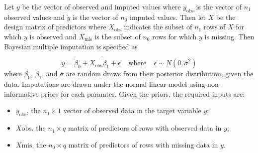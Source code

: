 \documentclass[12pt,]{article}
\providecommand{\tightlist}{%
  \setlength{\itemsep}{0pt}\setlength{\parskip}{0pt}}
\begin{document}
Let \(y\) be the vector of observed and imputed values where
\(y_{\text{obs}}\) is the vector of \(n_1\) observed values and
\(\dot{y}\) is the vector of \(n_0\) imputed values. Then let \(X\) be
the design matrix of predictors where \(X_{\text{obs}}\) indicates the
subset of \(n_1\) rows of \(X\) for which \(y\) is observed and
\(X_{\text{mis}}\) is the subset of \(n_0\) rows for which \(y\) is
missing. Then Bayesian multiple imputation is specified as

\[
\dot{y} = \dot{\beta}_0 + X_{\text{obs}}\dot{\beta}_1 + \dot{\epsilon} ~~~~~\text{where}~~~~~ \dot{\epsilon} \sim N(0, \dot{\sigma}^2)
\] where \(\dot{\beta}_0\), \(\dot{\beta}_1\), and \(\dot{\sigma}\) are
random draws from their posterior distribution, given the data.
Imputations are drawn under the normal linear model using
non-informative priors for each paramter. Given the priors, the required
inputs are:

\begin{itemize}
\tightlist
\item
  \(y_{\text{obs}}\), the \(n_1 \times 1\) vector of observed data in
  the target variable \(y\);
\item
  \(X{\text{obs}}\), the \(n_1 \times q\) matrix of predictors of rows
  with observed data in \(y\);
\item
  \(X{\text{mis}}\), the \(n_0 \times q\) matrix of predictors of rows
  with missing data in \(y\).
\end{itemize}
\end{document}
